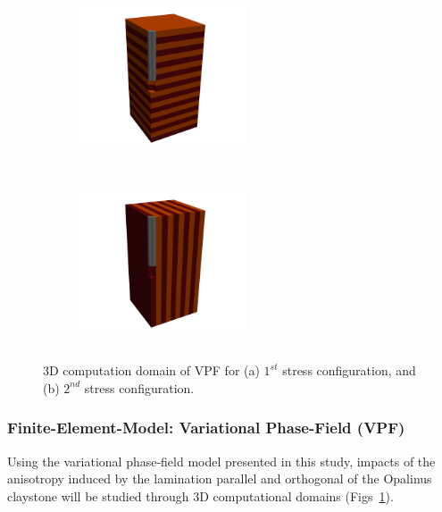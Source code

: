 \begin{figure}[!ht]
\begin{subfigure}[c]{0.48\textwidth}
\centering
\includegraphics[width=5cm,height=5cm]{figures/ME2b_init_para.png}
\subcaption{}
\end{subfigure}
\hfill
\begin{subfigure}[c]{0.48\textwidth}
\centering
\includegraphics[width=5cm,height=5cm]{figures/ME2b_init_orth.png}
\subcaption{}
\end{subfigure}
\caption{3D computation domain of VPF for (a) $1^{st}$ stress configuration, and (b) $2^{nd}$ stress configuration.}
\label{fig:VPF_ME2_B_init}
\end{figure}

\subsubsection*{Finite-Element-Model: Variational Phase-Field (VPF)}
Using the variational phase-field model presented in this study, impacts of the anisotropy induced by the lamination parallel and orthogonal of the Opalinus claystone will be studied through 3D computational domains (Figs~\ref{fig:VPF_ME2_B_init}).

